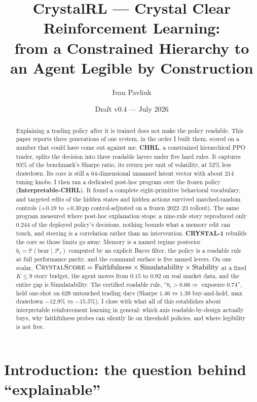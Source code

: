 \documentclass[11pt]{article}
\title{CrystalRL --- Crystal Clear Reinforcement Learning:\\
\large from a Constrained Hierarchy to an Agent Legible by Construction}
\author{Ivan Pavliuk}
\date{Draft v0.4 --- July 2026}
\newcommand{\Prob}{\mathbb{P}}
\begin{document}
\maketitle

\begin{abstract}
Explaining a trading policy after it is trained does not make the policy readable. This paper
reports three generations of one system, in the order I built them, scored on a number that
could have come out against me. \textbf{CHRL}, a constrained hierarchical PPO trader, splits the
decision into three readable layers under five hard rules. It captures $93\%$ of the benchmark's Sharpe
ratio, its return per unit of volatility, at $52\%$ less drawdown. Its core is still a 64-dimensional unnamed latent vector with about $214$
tuning knobs. I then ran a dedicated post-hoc program over the frozen policy
(\textbf{Interpretable-CHRL}). It found a complete eight-primitive behavioral vocabulary, and
targeted edits of the hidden states and hidden actions survived matched-random controls
($+0.19$ to $+0.30$\,pp control-adjusted on a frozen 2022--23 rollout). The same program measured
where post-hoc explanation stops: a nine-rule story reproduced only $0.244$ of the deployed
policy's decisions, nothing bounds what a memory edit can touch, and steering is a correlation
rather than an intervention. \textbf{CRYSTAL-1} rebuilds the core so those limits go away. Memory
is a named regime posterior $b_t = \Prob(\text{bear}\mid\mathcal{F}_t)$ computed by an explicit
Bayes filter, the policy is a readable rule at full performance parity, and the command surface
is five named levers. On one scalar,
$\textsc{CrystalScore} = \text{Faithfulness}\times\text{Simulatability}\times\text{Stability}$
at a fixed $K{\le}9$ story budget, the agent moves from $0.15$ to $0.92$ on real market data, and
the entire gap is Simulatability. The certified readable rule,
``$b_t > 0.66 \Rightarrow$ exposure $0.74$'', held one-shot on 629 untouched trading days
(Sharpe $1.46$ vs $1.39$ buy-and-hold, max drawdown $-12.9\%$ vs $-15.5\%$). I close with what
all of this establishes about interpretable reinforcement learning in general: which axis
readable-by-design actually buys, why faithfulness probes can silently lie on threshold policies,
and where legibility is not free.
\end{abstract}

\section{Introduction: the question behind ``explainable''}
\label{sec:intro}
\end{document}
